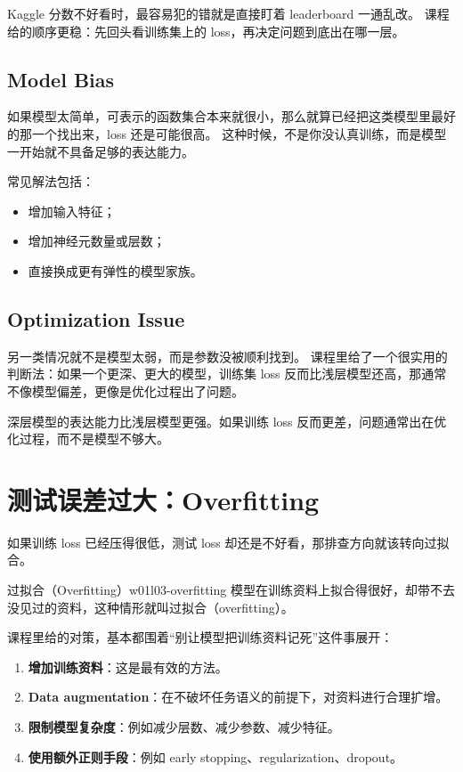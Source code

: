 \documentclass[main.tex]{subfiles}
\begin{document}
Kaggle 分数不好看时，最容易犯的错就是直接盯着 leaderboard 一通乱改。
课程给的顺序更稳：先回头看训练集上的 loss，再决定问题到底出在哪一层。

\subsection{Model Bias}
\label{sec:w01l03-model-bias}

如果模型太简单，可表示的函数集合本来就很小，那么就算已经把这类模型里最好的那一个找出来，loss 还是可能很高。
这种时候，不是你没认真训练，而是模型一开始就不具备足够的表达能力。

常见解法包括：
\begin{itemize}
  \item 增加输入特征；
  \item 增加神经元数量或层数；
  \item 直接换成更有弹性的模型家族。
\end{itemize}

\subsection{Optimization Issue}
\label{sec:w01l03-optimization-issue}

另一类情况就不是模型太弱，而是参数没被顺利找到。
课程里给了一个很实用的判断法：如果一个更深、更大的模型，训练集 loss 反而比浅层模型还高，那通常不像模型偏差，更像是优化过程出了问题。

\begin{warningbox}
深层模型的表达能力比浅层模型更强。如果训练 loss 反而更差，问题通常出在优化过程，而不是模型不够大。
\end{warningbox}

\section{测试误差过大：Overfitting}
\label{sec:w01l03-overfitting}

如果训练 loss 已经压得很低，测试 loss 却还是不好看，那排查方向就该转向过拟合。

\begin{definition}{过拟合（Overfitting）}{w01l03-overfitting}
模型在训练资料上拟合得很好，却带不去没见过的资料，这种情形就叫过拟合（overfitting）。
\end{definition}

课程里给的对策，基本都围着“别让模型把训练资料记死”这件事展开：
\begin{enumerate}
  \item \textbf{增加训练资料}：这是最有效的方法。
  \item \textbf{Data augmentation}：在不破坏任务语义的前提下，对资料进行合理扩增。
  \item \textbf{限制模型复杂度}：例如减少层数、减少参数、减少特征。
  \item \textbf{使用额外正则手段}：例如 early stopping、regularization、dropout。
\end{enumerate}
\end{document}
